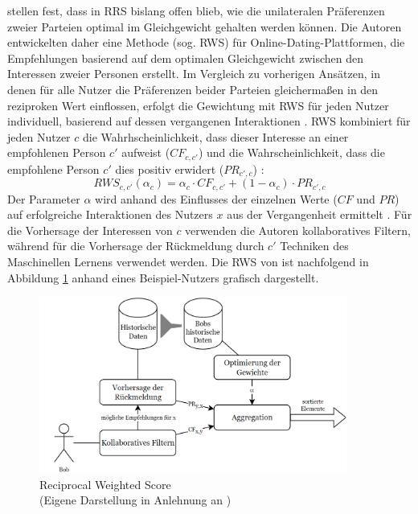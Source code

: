 \textcite[S. 131ff.]{kleinerman:2:inproceedings} stellen fest, dass in \ac{RRS} bislang offen blieb, wie die unilateralen Präferenzen zweier Parteien optimal im Gleichgewicht gehalten werden können.
Die Autoren entwickelten daher eine Methode (sog. \ac{RWS}) für Online-Dating-Plattformen, die Empfehlungen basierend auf dem optimalen Gleichgewicht zwischen den Interessen zweier Personen erstellt.
Im Vergleich zu vorherigen Ansätzen, in denen für alle Nutzer die Präferenzen beider Parteien gleichermaßen in den reziproken Wert einflossen, erfolgt die Gewichtung mit \ac{RWS} für jeden Nutzer individuell, basierend auf dessen vergangenen Interaktionen \cite[S. 133]{kleinerman:2:inproceedings}.
\ac{RWS} kombiniert für jeden Nutzer $c$ die Wahrhscheinlichkeit, dass dieser Interesse an einer empfohlenen Person $c'$ aufweist ($CF_{c,c'}$) und die Wahrscheinlichkeit, dass die empfohlene Person $c'$ dies positiv erwidert ($PR_{c',c}$) \cite[S. 131f.]{kleinerman:2:inproceedings}:
\begin{equation}\label{eq36}
    RWS_{c,c'}(\alpha_{c}) = \alpha_{c} \cdot CF_{c,c'} + (1-\alpha_{c}) \cdot PR_{c',c}
\end{equation}
Der Parameter $\alpha$ wird anhand des Einflusses der einzelnen Werte ($CF$ und $PR$) auf erfolgreiche Interaktionen des Nutzers $x$ aus der Vergangenheit ermittelt \cite[S. 135]{kleinerman:2:inproceedings}.
Für die Vorhersage der Interessen von $c$ verwenden die Autoren kollaboratives Filtern, während für die Vorhersage der Rückmeldung durch $c'$ Techniken des Maschinellen Lernens verwendet werden.
Die \ac{RWS} von \textcite[S. 134]{kleinerman:2:inproceedings} ist nachfolgend in Abbildung \ref{fig:relatedwork:abb2} anhand eines Beispiel-Nutzers grafisch dargestellt.

\begin{figure}[H]
    \centering
	\includegraphics[width=0.9\textwidth]{gfx/rws.png}
	\caption[Reciprocal Weighted Score]{Reciprocal Weighted Score\\
    (Eigene Darstellung in Anlehnung an \cite[S. 134]{kleinerman:2:inproceedings})}
	\label{fig:relatedwork:abb2}
\end{figure}

